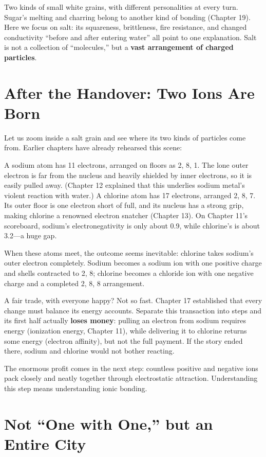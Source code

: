 Two kinds of small white grains, with different personalities at every turn. Sugar's melting and charring belong to another kind of bonding (Chapter 19). Here we focus on salt: its squareness, brittleness, fire resistance, and changed conductivity ``before and after entering water'' all point to one explanation. Salt is not a collection of ``molecules,'' but a \textbf{vast arrangement of charged particles}.

\section{After the Handover: Two Ions Are Born}

Let us zoom inside a salt grain and see where its two kinds of particles come from. Earlier chapters have already rehearsed this scene:

A sodium atom has 11 electrons, arranged on floors as 2, 8, 1. The lone outer electron is far from the nucleus and heavily shielded by inner electrons, so it is easily pulled away. (Chapter 12 explained that this underlies sodium metal's violent reaction with water.) A chlorine atom has 17 electrons, arranged 2, 8, 7. Its outer floor is one electron short of full, and its nucleus has a strong grip, making chlorine a renowned electron snatcher (Chapter 13). On Chapter 11's scoreboard, sodium's electronegativity is only about 0.9, while chlorine's is about 3.2---a huge gap.

When these atoms meet, the outcome seems inevitable: chlorine takes sodium's outer electron completely. Sodium becomes a sodium ion with one positive charge and shells contracted to 2, 8; chlorine becomes a chloride ion with one negative charge and a completed 2, 8, 8 arrangement.

A fair trade, with everyone happy? Not so fast. Chapter 17 established that every change must balance its energy accounts. Separate this transaction into steps and its first half actually \textbf{loses money}: pulling an electron from sodium requires energy (ionization energy, Chapter 11), while delivering it to chlorine returns some energy (electron affinity), but not the full payment. If the story ended there, sodium and chlorine would not bother reacting.

The enormous profit comes in the next step: countless positive and negative ions pack closely and neatly together through electrostatic attraction. Understanding this step means understanding ionic bonding.

\section{Not ``One with One,'' but an Entire City}

